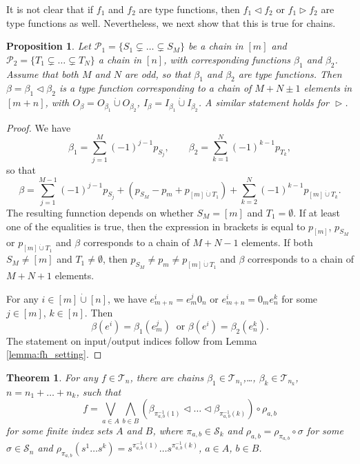 \documentclass[12pt]{article}
\newtheorem{theorem}{Theorem}
\newtheorem{prop}{Proposition}
\theoremstyle{definition}
\theoremstyle{remark}
\def\Te{\mathcal T}
\def\Pe{\mathcal P}
\def\permut{\mathscr{S}}
\def\vtl{\vartriangleleft}
\def\vtr{\vartriangleright}
\begin{document}
It is not clear that if $f_1$ and $f_2$ are type functions, then $f_1\vtl f_2$ or $f_1\vtr
f_2$ are type functions as well. Nevertheless, we next show that this is true for chains.



\begin{prop}\label{prop:append_chains} Let $\Pe_1=\{S_1\subsetneq \dots\subsetneq S_M\}$ be a chain in  $[m]$ and
$\Pe_2=\{T_1\subsetneq \dots \subsetneq T_N\}$ a chain in $[n]$, 
 with corresponding functions $\beta_1$ and $\beta_2$. Assume that both $M$ and $N$ are
 odd, so that $\beta_1$ and $\beta_2$ are type functions. Then 
$\beta=\beta_1\vtl \beta_2$ is a type function corresponding to a chain of $M+N\pm 1$
elements in $[m+n]$, with $O_\beta=O_{\beta_1}\dot{\cup}O_{\beta_2}$,
$I_\beta=I_{\beta_1}\dot{\cup} I_{\beta_2}$. A similar statement
holds for $\vtr$.

\end{prop}

\begin{proof} We have
\[
\beta_1=\sum_{j=1}^M(-1)^{j-1}p_{S_j},\qquad \beta_2=\sum_{k=1}^N(-1)^{k-1}p_{T_k},
\]
so that
\[
\beta=\sum_{j=1}^{M-1}(-1)^{j-1}p_{S_j}+(p_{S_M}-p_m+p_{[m]\dot{\cup}
T_1})+\sum_{k=2}^N(-1)^{k-1}p_{[m]\dot{\cup} T_k}.
\]
The resulting funnction depends on whether  $S_M=[m]$ and $T_1=\emptyset$. If at least one
of the equalities is true, then the expression in brackets is equal to $p_{[m]}$,
$p_{S_M}$ or $p_{[m]\dot{\cup} T_1}$  and $\beta$ corresponds to
a chain of $M+N-1$ elements. If both $S_M\ne [m]$ and $T_1\ne \emptyset$, then
$p_{S_M}\ne p_m\ne p_{[m]\dot{\cup} T_1}$ and $\beta$ corresponds to a chain of
$M+N+1$ elements.

For any $i\in [m]\dot{\cup} [n]$, we have  $e^i_{m+n}=e^j_m0_n$ or $e^i_{m+n}=0_me^k_n$
for some $j\in [m]$, $k\in [n]$. Then   
\[
\beta(e^i)=\beta_1(e^j_m)\ \text{ or } \beta(e^i)=\beta_2(e^k_n).
\]
The statement on input/output indices  follow from Lemma \ref{lemma:fh_setting}. 

\end{proof}


\begin{theorem}\label{thm:structure}
For any $f\in \Te_n$, there are chains $\beta_1\in \Te_{n_1}$,\dots, $\beta_k\in
\Te_{n_k}$, $n=n_1+\dots+n_k$, such that 
\[
f=\bigvee_{a\in A}\bigwedge_{b\in B} (\beta_{\pi^{-1}_{a,b}(1)}\vtl \dots \vtl
\beta_{\pi^{-1}_{a,b}(k)})\circ {\rho_{a,b}}
\]
for some finite index sets $A$ and $B$, where $\pi_{a,b}\in \permut_k$ and $\rho_{a,b}=\rho_{\pi_{a,b}}\circ \sigma$ for some $\sigma\in\permut_n$ and 
$\rho_{\pi_{a,b}}(s^1\dots
s^k)=s^{\pi^{-1}_{a,b}(1)}\dots s^{\pi^{-1}_{a,b}(k)}$, $a\in A$, $b\in B$.
\end{theorem}
\end{document}
